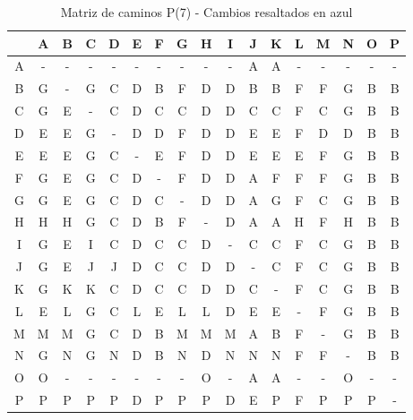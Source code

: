 \documentclass[12pt]{article}
\begin{document}
\begin{table}[h!]
\centering
\begin{tabular}{|c|c|c|c|c|c|c|c|c|c|c|c|c|c|c|c|c|}
\hline
 & A & B & C & D & E & F & G & H & I & J & K & L & M & N & O & P \\\hline
A & - & - & - & - & - & - & - & - & - & A & A & - & - & - & - & - \\\hline
B & \cellcolor{lightblue} G & - & \cellcolor{lightblue} G & \cellcolor{lightblue} C & \cellcolor{lightblue} D & B & F & \cellcolor{lightblue} D & \cellcolor{lightblue} D & B & B & F & F & \cellcolor{lightblue} G & B & B \\\hline
C & \cellcolor{lightblue} G & E & - & C & D & C & C & D & D & C & C & F & C & \cellcolor{lightblue} G & B & B \\\hline
D & E & E & \cellcolor{lightblue} G & - & D & D & F & D & D & E & E & F & D & D & B & B \\\hline
E & E & E & \cellcolor{lightblue} G & \cellcolor{lightblue} C & - & E & F & \cellcolor{lightblue} D & \cellcolor{lightblue} D & E & E & E & F & \cellcolor{lightblue} G & B & B \\\hline
F & \cellcolor{lightblue} G & \cellcolor{lightblue} E & \cellcolor{lightblue} G & \cellcolor{lightblue} C & \cellcolor{lightblue} D & - & F & \cellcolor{lightblue} D & \cellcolor{lightblue} D & \cellcolor{lightblue} A & F & F & F & \cellcolor{lightblue} G & \cellcolor{lightblue} B & \cellcolor{lightblue} B \\\hline
G & G & E & G & C & D & C & - & D & D & A & G & F & C & G & B & B \\\hline
H & H & H & \cellcolor{lightblue} G & \cellcolor{lightblue} C & \cellcolor{lightblue} D & B & F & - & \cellcolor{lightblue} D & A & A & H & F & H & B & B \\\hline
I & \cellcolor{lightblue} G & E & I & C & D & C & C & D & - & C & C & F & C & \cellcolor{lightblue} G & B & B \\\hline
J & \cellcolor{lightblue} G & E & J & J & D & C & C & D & D & - & C & F & C & \cellcolor{lightblue} G & B & B \\\hline
K & \cellcolor{lightblue} G & K & K & C & D & C & C & D & D & C & - & F & C & \cellcolor{lightblue} G & B & B \\\hline
L & E & L & \cellcolor{lightblue} G & \cellcolor{lightblue} C & L & E & L & L & \cellcolor{lightblue} D & E & E & - & F & \cellcolor{lightblue} G & B & B \\\hline
M & M & M & \cellcolor{lightblue} G & \cellcolor{lightblue} C & \cellcolor{lightblue} D & B & M & M & M & A & B & F & - & \cellcolor{lightblue} G & B & B \\\hline
N & \cellcolor{lightblue} G & N & \cellcolor{lightblue} G & N & D & B & N & D & N & N & N & F & F & - & B & B \\\hline
O & O & - & - & - & - & - & - & O & - & A & A & - & - & O & - & - \\\hline
P & P & P & P & P & D & P & P & P & D & E & P & F & P & P & P & - \\\hline
\end{tabular}
\caption{Matriz de caminos P(7) - Cambios resaltados en azul}
\end{table}
\end{document}
